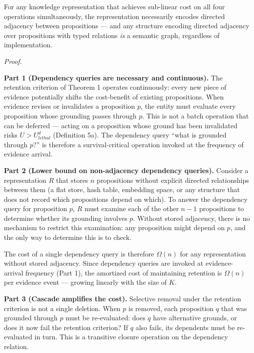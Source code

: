 \documentclass[
]{article}
\begin{document}
For any knowledge representation that achieves sub-linear cost on all
four operations simultaneously, the representation necessarily encodes
directed adjacency between propositions --- and any structure encoding
directed adjacency over propositions with typed relations \emph{is} a
semantic graph, regardless of implementation.

\emph{Proof.}

\textbf{Part 1 (Dependency queries are necessary and continuous).} The
retention criterion of Theorem 1 operates continuously: every new piece
of evidence potentially shifts the cost-benefit of existing
propositions. When evidence revises or invalidates a proposition \(p\),
the entity must evaluate every proposition whose grounding passes
through \(p\). This is not a batch operation that can be deferred ---
acting on a proposition whose ground has been invalidated risks
\(U > U_{lethal}^d\) (Definition 5a). The dependency query ``what is
grounded through \(p\)?'' is therefore a survival-critical operation
invoked at the frequency of evidence arrival.

\textbf{Part 2 (Lower bound on non-adjacency dependency queries).}
Consider a representation \(R\) that stores \(n\) propositions without
explicit directed relationships between them (a flat store, hash table,
embedding space, or any structure that does not record which propositions
depend on which). To answer the dependency query for proposition \(p\),
\(R\) must examine each of the other \(n - 1\) propositions to determine
whether its grounding involves \(p\). Without stored adjacency, there is
no mechanism to restrict this examination: any proposition might depend
on \(p\), and the only way to determine this is to check.

The cost of a single dependency query is therefore \(\Omega(n)\) for any
representation without stored adjacency. Since dependency queries are
invoked at evidence-arrival frequency (Part 1), the amortized cost of
maintaining retention is \(\Omega(n)\) per evidence event --- growing
linearly with the size of \(K\).

\textbf{Part 3 (Cascade amplifies the cost).} Selective removal under
the retention criterion is not a single deletion. When \(p\) is removed,
each proposition \(q\) that was grounded through \(p\) must be
re-evaluated: does \(q\) have alternative grounds, or does it now fail
the retention criterion? If \(q\) also fails, its dependents must be
re-evaluated in turn. This is a transitive closure operation on the
dependency relation.
\end{document}
